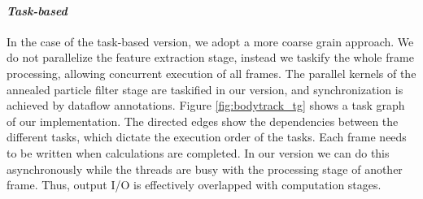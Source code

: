 \paragraph{\textit{Task-based}} In the case of the task-based version, we adopt a more coarse grain approach. 
We do not parallelize the feature extraction stage, instead we 
taskify the whole frame processing, allowing concurrent execution of all frames. 
The parallel kernels of the annealed particle filter stage are taskified in our version, and synchronization is achieved
by dataflow annotations.  Figure \ref{fig:bodytrack_tg} shows a task graph of our implementation.  The directed edges show the
dependencies between the different tasks, which dictate the execution order of the tasks.
Each frame needs to be written when calculations are completed. In our version we can do this asynchronously while the threads are
busy with the processing stage of another frame.  Thus, output I/O is effectively overlapped with computation stages.



